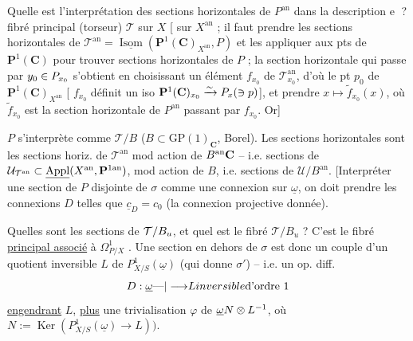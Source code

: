Quelle est l'interprétation des sections horizontales  de $P^{\mathrm{an}}$ dans la description \textcircled{e} ?  fibré principal (torseur) $\mathcal T$ sur $X$ [ sur $X^{\mathrm{an}}$ ; il faut prendre les sections horizontales de $\mathcal T^{\mathrm{an}}=\underline{\operatorname{Isom}}(\mathbf P^1(\mathbf C)_{X^{\mathrm{an}}},P)$ et les appliquer aux pts de $\mathbf P^1(\mathbf C)$ pour trouver sections horizontales de $P$ ; la section horizontale qui passe par ${y_0}\in P_{x_0}$ s'obtient en choisissant un  élément $f_{x_0}$ de $\mathcal T_{x_0}^{\mathrm{an}}$, d'où  le pt $p_0$ de $\mathbf P^1(\mathbf C)_{X^{\mathrm{an}}}$ [ $f_{x_0}$ définit un iso $\mathbf P^1(\mathbf C)_{{{x_0}}}\xrightarrow{\sim}P_x(\ni p)$], et prendre $x\mapsto\widetilde f_{x_0}(x)$, où $\widetilde f_{x_0}$ est la section horizontale  de $P^{\mathrm{an}}$ passant par $f_{x_0}$. Or]

$P$ s'interprète comme $\mathcal T/B$ ($B\subset\mathrm{GP}(1)_{\mathbf C}$, Borel). Les sections  horizontales  sont les sections horiz. de $\mathcal T^{\mathrm{an}}$ mod action de $B^{\mathrm{an}}{{\mathbf C}}$ -- i.e. sections de $\mathcal U_{{{\mathcal T^{\mathrm{an}}}}}\subset\underline{\operatorname{Appl}}(X^{\mathrm{an}},\mathbf P^{1\mathrm{an}})$, mod action de $B$, i.e. sections de $\mathcal U/B^{\mathrm{an}}$. [Interpréter une section de $P$ disjointe de $\sigma$ comme une connexion  sur $\underline\omega$,  on doit prendre les connexions $D$ telles que $\underline c_D=c_0$ (la connexion projective donnée).

Quelles sont les sections  de $\mathcal T/B_{{u}}$, et quel est
le fibré $\mathcal T/B_u$  ? C'est le fibré \uline{principal associé} à $\Omega^1_{P/X}$ . Une section en dehors de $\sigma$ est donc  un couple d'un quotient inversible $L$ de $P^1_{X/S}(\underline\omega)$ (qui donne $\sigma'$) -- i.e. un op. diff.
\[
D:\underline\omega{\text{---}|\longrightarrow}L{{inversible}}{\text{d'ordre 1}}
\]
\uline{engendrant} $L$, \uline{plus} une trivialisation $\varphi$ de ${{\underline\omega}}{N\otimes L^{-1}}$, où $N:=\operatorname{Ker}(P^1_{X/S}(\underline\omega)\longrightarrow L))$.

